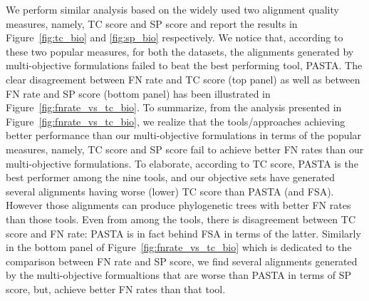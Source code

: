 We perform similar analysis based on the widely used two alignment quality measures, namely, TC score and SP score and report the results in Figure~\ref{fig:tc_bio} and \ref{fig:sp_bio} respectively. We notice that, according to these two popular measures, for both the datasets, the alignments generated by multi-objective formulations failed to beat the best performing tool, PASTA. The clear disagreement between FN rate and TC score (top panel) as well as between FN rate and SP score (bottom panel) has been illustrated in Figure~\ref{fig:fnrate_vs_tc_bio}. To summarize, from the analysis presented in Figure~\ref{fig:fnrate_vs_tc_bio}, we realize that the tools/approaches achieving better performance than our multi-objective formulations in terms of the popular measures, namely, TC score and SP score fail to achieve better FN rates than our multi-objective formulations. To elaborate, according to TC score, PASTA is the best performer among the nine tools, and our objective sets have generated several alignments having worse (lower) TC score than PASTA (and FSA). However those alignments can produce phylogenetic trees with better FN rates than those tools. Even from among the tools, there is disagreement between TC score and FN rate: PASTA is in fact behind FSA in terms of the latter. Similarly in the bottom panel of Figure~\ref{fig:fnrate_vs_tc_bio} which is dedicated to the comparison between FN rate and SP score, we find several alignments generated by the multi-objective formualtions that are worse than PASTA in terms of SP score, but, achieve better FN rates than that tool. 


